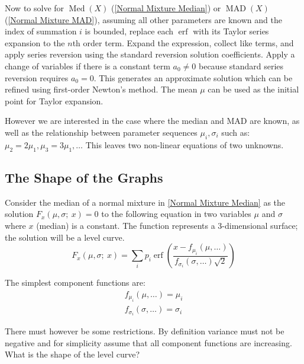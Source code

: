 \documentclass{article}
\DeclareMathOperator\erf{erf}
\DeclareMathOperator\Med{Med}
\DeclareMathOperator\MAD{MAD}
\begin{document}
Now to solve for $\Med(X)$ (\ref{Normal Mixture Median}) or $\MAD(X)$ (\ref{Normal Mixture MAD}), assuming all other parameters are known and the index of summation $i$ is bounded, replace each $\erf$ with its Taylor series expansion to the $n$th order term. Expand the expression, collect like terms, and apply series reversion using the standard reversion solution coefficients. Apply a change of variables if there is a constant term $a_0 \neq 0$ because standard series reversion requires $a_0 = 0$. This generates an approximate solution which can be refined using first-order Newton's method. The mean $\mu$ can be used as the initial point for Taylor expansion.

However we are interested in the case where the median and MAD are known, as well as the relationship between parameter sequences $\mu_i, \sigma_i$ such as: $\mu_2 = 2\mu_1, \mu_3 = 3\mu_1, \ldots$ This leaves two non-linear equations of two unknowns.

\subsection{The Shape of the Graphs}

Consider the median of a normal mixture in \ref{Normal Mixture Median} as the solution $F_x(\mu, \sigma;\ x) = 0$ to the following equation in two variables $\mu$ and $\sigma$ where $x$ (median) is a constant. The function represents a 3-dimensional surface; the solution will be a level curve.
%
\begin{equation}\label{Normal Mixture Median Function}
F_x(\mu, \sigma;\ x) = \sum_i p_i \erf \left( \frac
    {x - f_{\mu_i}(\mu, \ldots)}
    {f_{\sigma_i}(\sigma, \ldots)\sqrt{2}} \right)
\end{equation}

The simplest component functions are:
%
\begin{equation}\label{Normal Mixture Median Component Functions}
\begin{split}
f_{\mu_i}(\mu, \ldots) = \mu_i \\
f_{\sigma_i}(\sigma, \ldots) = \sigma_i
\end{split}
\end{equation}

There must however be some restrictions. By definition variance must not be negative and for simplicity assume that all component functions are increasing. What is the shape of the level curve?
\end{document}
